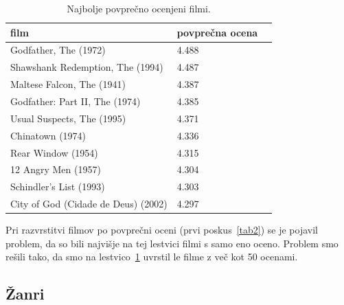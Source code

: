 \documentclass[a4paper,11pt]{article}
\begin{document}
\begin{table}[htbp]
\caption{Najbolje povprečno ocenjeni filmi.}
\label{tab1}
\begin{center}
\begin{tabular}{llp{3cm}}
\hline
film & povprečna ocena \\
\hline
Godfather, The (1972) & 4.488 \\
Shawshank Redemption, The (1994) & 4.487 \\
Maltese Falcon, The (1941) & 4.387 \\
Godfather: Part II, The (1974) & 4.385 \\
Usual Suspects, The (1995) & 4.371 \\
Chinatown (1974) & 4.336 \\
Rear Window (1954) & 4.315 \\
12 Angry Men (1957) & 4.304 \\
Schindler's List (1993) & 4.303 \\
City of God (Cidade de Deus) (2002) & 4.297 \\
\hline
\end{tabular}
\end{center}
\end{table}
Pri razvrstitvi filmov po povprečni oceni (prvi poskus~\ref{tab2}) se je pojavil
problem, da so bili najvišje na tej lestvici filmi s samo eno oceno. Problem smo
rešili tako, da smo na lestvico~\ref{tab1} uvrstil le filme z več kot 50 ocenami.

\subsection{Žanri}
\end{document}
